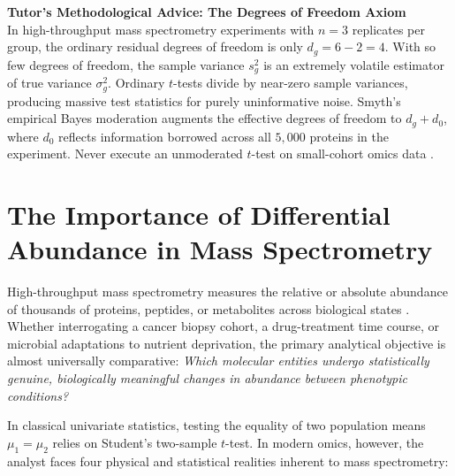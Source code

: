 \documentclass[11pt,twoside,openright]{book}
\begin{document}
\begin{notebox}
\textbf{Tutor's Methodological Advice: The Degrees of Freedom Axiom}\\
In high-throughput mass spectrometry experiments with $n = 3$ replicates per group, the ordinary residual degrees of freedom is only $d_g = 6 - 2 = 4$. With so few degrees of freedom, the sample variance $s_g^2$ is an extremely volatile estimator of true variance $\sigma_g^2$. Ordinary $t$-tests divide by near-zero sample variances, producing massive test statistics for purely uninformative noise. Smyth's empirical Bayes moderation augments the effective degrees of freedom to $d_g + d_0$, where $d_0$ reflects information borrowed across all $5{,}000$ proteins in the experiment. Never execute an unmoderated $t$-test on small-cohort omics data \cite{smyth2004linear, ritchie2015limma}.
\end{notebox}


\section{The Importance of Differential Abundance in Mass Spectrometry}

High-throughput mass spectrometry measures the relative or absolute abundance of thousands of proteins, peptides, or metabolites across biological states \cite{aebersold2016mass, cox2008maxquant, demichev2020dia, gatto2023qfeatures}. Whether interrogating a cancer biopsy cohort, a drug-treatment time course, or microbial adaptations to nutrient deprivation, the primary analytical objective is almost universally comparative: \textit{Which molecular entities undergo statistically genuine, biologically meaningful changes in abundance between phenotypic conditions?}

In classical univariate statistics, testing the equality of two population means $\mu_1 = \mu_2$ relies on Student's two-sample $t$-test. In modern omics, however, the analyst faces four physical and statistical realities inherent to mass spectrometry:
\end{document}
